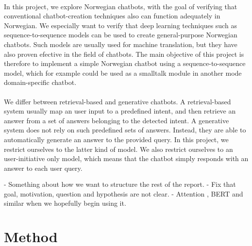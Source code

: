 \documentclass{article}
\begin{document}
\paragraph{}
In this project, we explore Norwegian chatbots, with the goal of verifying that
conventional chatbot-creation techniques also can function adequately in
Norwegian. We especially want to verify that deep learning techniques such as
sequence-to-sequence models \cite{Cho2014} can be used to create
general-purpose Norwegian chatbots. Such models are usually used for machine
translation, but they have also proven efective in the field of chatbots. The
main objective of this project is therefore to implement a simple Norwegian
chatbot using a sequence-to-sequence model, which for example could be used as
a smalltalk module in another mode domain-specific chatbot.

\paragraph{}
We differ between retrieval-based and generative chatbots. A retrieval-based
system usually map an user input to a predefined intent, and then retrieve an
answer from a set of answers belonging to the detected intent. A generative
system does not rely on such predefined sets of answers.  Instead, they are
able to automatically generate an answer to the provided query. In this
project, we restrict ourselves to the latter kind of model. We also restrict
ourselves to an user-initiative only model, which means that the chatbot simply
responds with an answer to each user query.

\if
- Something about how we want to structure the rest of the report.  
- Fix that goal, motivation, question and hypothesis are not clear.  
- Attention \cite{Bahdanau2015}, BERT and similar when we hopefully begin using it.
\fi

\section{Method}

\end{document}
